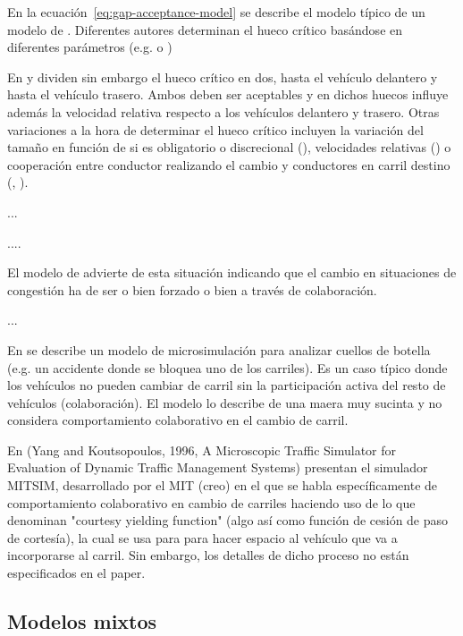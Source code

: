 En la ecuación~\ref{eq:gap-acceptance-model} se describe el modelo típico de un modelo de .  Diferentes autores determinan el hueco crítico basándose en diferentes parámetros (e.g. \cite{Miller1972} o \cite{Cassidy1995})

En \cite{Gipps1986} y \cite{Ahmed1996} dividen sin embargo el hueco crítico en dos, hasta el vehículo delantero y hasta el vehículo trasero. Ambos deben ser aceptables y en dichos huecos influye además la velocidad relativa respecto a los vehículos delantero y trasero. Otras variaciones a la hora de determinar el hueco crítico incluyen la variación del tamaño en función de si es obligatorio o discrecional (\cite{Toledo2003}), velocidades relativas (\cite{Ahmed1999}) o cooperación entre conductor realizando el cambio y conductores en carril destino (\cite{Ahmed1999}, \cite{Hidas2002}).

...


....

El modelo de \cite{Hidas2002} advierte de esta situación indicando que el cambio en situaciones de congestión ha de ser o bien forzado o bien a través de colaboración.



...

En \cite{Fritzsche1994} se describe un modelo de microsimulación para analizar cuellos de botella (e.g. un accidente donde se bloquea uno de los carriles). Es un caso típico donde los vehículos no pueden cambiar de carril sin la participación activa del resto de vehículos (colaboración). El modelo lo describe de una maera muy sucinta y no considera comportamiento colaborativo en el cambio de carril.

En (Yang and Koutsopoulos, 1996, A Microscopic Traffic Simulator for Evaluation of Dynamic Traffic Management Systems) presentan el simulador MITSIM, desarrollado por el MIT (creo) en el que se habla específicamente de comportamiento colaborativo en cambio de carriles haciendo uso de lo que denominan "courtesy yielding function" (algo así como función de cesión de paso de cortesía), la cual se usa para para hacer espacio al vehículo que va a incorporarse al carril. Sin embargo, los detalles de dicho proceso no están especificados en el paper.

\subsection{Modelos mixtos}

